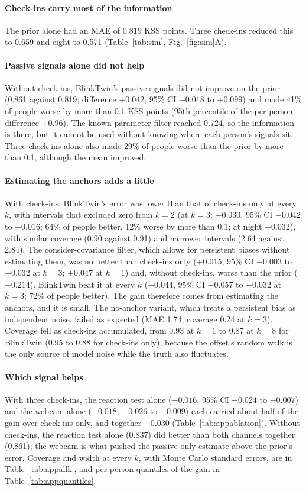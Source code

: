 \paragraph*{Check-ins carry most of the information} The prior alone had an MAE of 0.819 KSS points. Three check-ins reduced this to 0.659 and eight to 0.571 (Table~\ref{tab:sim}, Fig.~\ref{fig:sim}A).

\paragraph*{Passive signals alone did not help} Without check-ins, BlinkTwin's passive signals did not improve on the prior (0.861 against 0.819; difference $+0.042$, 95\% CI $-0.018$ to $+0.099$) and made 41\% of people worse by more than 0.1 KSS points (95th percentile of the per-person difference $+0.96$). The known-parameter filter reached 0.724, so the information is there, but it cannot be used without knowing where each person's signals sit. Three check-ins alone also made 29\% of people worse than the prior by more than 0.1, although the mean improved.

\paragraph*{Estimating the anchors adds a little} With check-ins, BlinkTwin's error was lower than that of check-ins only at every $k$, with intervals that excluded zero from $k = 2$ (at $k = 3$: $-0.030$, 95\% CI $-0.042$ to $-0.016$; 64\% of people better, 12\% worse by more than 0.1; at night $-0.032$), with similar coverage (0.90 against 0.91) and narrower intervals (2.64 against 2.84). The consider-covariance filter, which allows for persistent biases without estimating them, was no better than check-ins only ($+0.015$, 95\% CI $-0.003$ to $+0.032$ at $k = 3$; $+0.047$ at $k = 1$) and, without check-ins, worse than the prior ($+0.214$). BlinkTwin beat it at every $k$ ($-0.044$, 95\% CI $-0.057$ to $-0.032$ at $k = 3$; 72\% of people better). The gain therefore comes from estimating the anchors, and it is small. The no-anchor variant, which treats a persistent bias as independent noise, failed as expected (MAE 1.74, coverage 0.24 at $k = 3$). Coverage fell as check-ins accumulated, from 0.93 at $k = 1$ to 0.87 at $k = 8$ for BlinkTwin (0.95 to 0.88 for check-ins only), because the offset's random walk is the only source of model noise while the truth also fluctuates.

\paragraph*{Which signal helps} With three check-ins, the reaction test alone ($-0.016$, 95\% CI $-0.024$ to $-0.007$) and the webcam alone ($-0.018$, $-0.026$ to $-0.009$) each carried about half of the gain over check-ins only, and together $-0.030$ (Table~\ref{tab:appablation}). Without check-ins, the reaction test alone (0.837) did better than both channels together (0.861); the webcam is what pushed the passive-only estimate above the prior's error. Coverage and width at every $k$, with Monte Carlo standard errors, are in Table~\ref{tab:appallk}, and per-person quantiles of the gain in Table~\ref{tab:appquantiles}.

